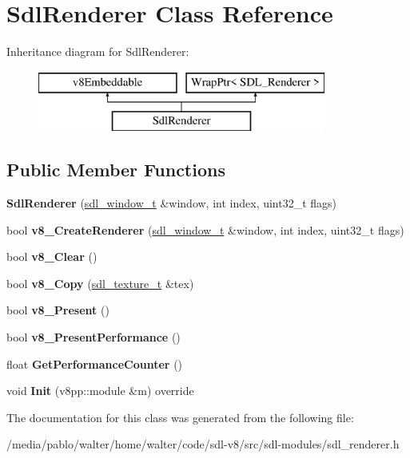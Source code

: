 \hypertarget{classSdlRenderer}{}\section{Sdl\+Renderer Class Reference}
\label{classSdlRenderer}
Inheritance diagram for Sdl\+Renderer\+:\begin{figure}[H]
\begin{center}
\leavevmode
\includegraphics[height=2.000000cm]{classSdlRenderer}
\end{center}
\end{figure}
\subsection*{Public Member Functions}
\begin{DoxyCompactItemize}
\item 
\mbox{\label{classSdlRenderer_a01a4de18bf05043db0cc5875b1ada189}} 
{\bfseries Sdl\+Renderer} (\mbox{\hyperlink{classWrapPtr}{sdl\+\_\+window\+\_\+t}} \&window, int index, uint32\+\_\+t flags)
\item 
\mbox{\label{classSdlRenderer_a212328a3be574a36dbc1b3bcb4d21339}} 
bool {\bfseries v8\+\_\+\+Create\+Renderer} (\mbox{\hyperlink{classWrapPtr}{sdl\+\_\+window\+\_\+t}} \&window, int index, uint32\+\_\+t flags)
\item 
\mbox{\label{classSdlRenderer_ac6aad8ffa54187e8426c51b1dca24656}} 
bool {\bfseries v8\+\_\+\+Clear} ()
\item 
\mbox{\label{classSdlRenderer_a98cef8dd7998a373e9e4cf4da7d80c8e}} 
bool {\bfseries v8\+\_\+\+Copy} (\mbox{\hyperlink{classWrapPtr}{sdl\+\_\+texture\+\_\+t}} \&tex)
\item 
\mbox{\label{classSdlRenderer_a53f0ae613237688b434e3612b18dcaa5}} 
bool {\bfseries v8\+\_\+\+Present} ()
\item 
\mbox{\label{classSdlRenderer_af70724603c6fcc4e636bf03dfb28c01d}} 
bool {\bfseries v8\+\_\+\+Present\+Performance} ()
\item 
\mbox{\label{classSdlRenderer_ad477a77633a1dbbd16a66f143e2fed9f}} 
float {\bfseries Get\+Performance\+Counter} ()
\item 
\mbox{\label{classSdlRenderer_ac34ac00afdf0884e2fdc7910b3fc21ce}} 
void {\bfseries Init} (v8pp\+::module \&m) override
\end{DoxyCompactItemize}


The documentation for this class was generated from the following file\+:\begin{DoxyCompactItemize}
\item 
/media/pablo/walter/home/walter/code/sdl-\/v8/src/sdl-\/modules/sdl\+\_\+renderer.\+h\end{DoxyCompactItemize}
